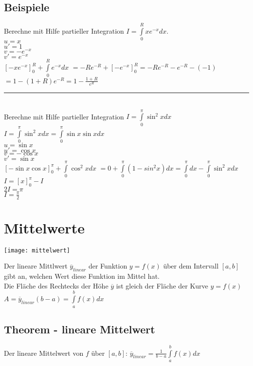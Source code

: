 \documentclass[../main.tex]{subfiles}
\begin{document}
\subsection{Beispiele}
Berechne mit Hilfe partieller Integration $I=\int\limits_0^Rxe^{-x}dx$.\\
$u=x$ \\
$u'=1$ \\
$v=-e^{-x}$\\
$v'=e^{-x}$\\
$\left[ -xe^{-x}\right]_0^R + \int\limits_0^Re^{-x}dx$ 
$ = -Re^{-R}+ \left[ -e^{-x}\right]_0^R = -Re^{-R}-e^{-R}-(-1)$
$ = 1-(1+R)e^{-R} = 1-\frac{1+R}{e^R} $ \\
\noindent\rule{8cm}{0.4pt} \\
Berechne mit Hilfe partieller Integration $I=\int\limits_0^\pi\sin^2xdx$\\
$I=\int\limits_0^\pi\sin^2xdx = \int\limits_0^\pi\sin x \sin xdx$ \\
$u=\sin x$ \\
$u'=\cos x$ \\
$v=-\cos x$ \\
$v'=\sin x$ \\
$ \left[ -\sin x \cos x\right]_0^\pi + \int\limits_0^\pi\cos^2xdx$
$ = 0+\int\limits_0^\pi(1-sin^2x)dx = \int\limits_0^\pi dx - \int\limits_0^\pi\sin^2xdx$ \\
$ I = \left[x\right]_0^\pi -I$ \\
$2I = \pi$ \\
$I=\frac{\pi}{2}$

\section{Mittelwerte}
\begin{minipage}{0.45\textwidth}
    \texttt{[image: mittelwert]}
\end{minipage} \hfill
\begin{minipage}{0.5\textwidth}
    Der lineare Mittlwert $\overline{y}_{linear}$ der Funktion $y=f(x)$
    über dem Intervall $[a,b]$ gibt an, welchen Wert diese Funktion im Mittel hat. \\
    Die Fläche des Rechtecks der Höhe $\overline{y}$ ist gleich der Fläche der Kurve
    $y=f(x)$ \\
    $A = \overline{y}_{linear}(b-a) = \int\limits_a^bf(x)dx$
\end{minipage}

\subsection{Theorem - lineare Mittelwert}
Der lineare Mittelwert von $f$ über $[a,b]$: $\overline{y}_{linear} = \frac{1}{b-a}\int\limits_a^bf(x)dx$
\end{document}
